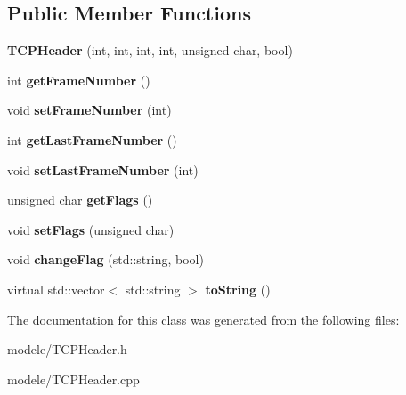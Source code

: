 \subsection*{Public Member Functions}
\begin{DoxyCompactItemize}
\item 
\hypertarget{class_t_c_p_header_adc62713dd706143c33ffd9f64bf953ba}{{\bfseries T\-C\-P\-Header} (int, int, int, int, unsigned char, bool)}\label{class_t_c_p_header_adc62713dd706143c33ffd9f64bf953ba}

\item 
\hypertarget{class_t_c_p_header_ae632ea82a7abfd4c8fab172637e86549}{int {\bfseries get\-Frame\-Number} ()}\label{class_t_c_p_header_ae632ea82a7abfd4c8fab172637e86549}

\item 
\hypertarget{class_t_c_p_header_a0042be1304d597b60363854bf9ca6bda}{void {\bfseries set\-Frame\-Number} (int)}\label{class_t_c_p_header_a0042be1304d597b60363854bf9ca6bda}

\item 
\hypertarget{class_t_c_p_header_a75eaeac4f1c200fd6635cbaa7359ce8d}{int {\bfseries get\-Last\-Frame\-Number} ()}\label{class_t_c_p_header_a75eaeac4f1c200fd6635cbaa7359ce8d}

\item 
\hypertarget{class_t_c_p_header_ac7e097249679015f91ab658c01e0ac37}{void {\bfseries set\-Last\-Frame\-Number} (int)}\label{class_t_c_p_header_ac7e097249679015f91ab658c01e0ac37}

\item 
\hypertarget{class_t_c_p_header_a9262d04f16f6a191b5184f2ebe9ec3e1}{unsigned char {\bfseries get\-Flags} ()}\label{class_t_c_p_header_a9262d04f16f6a191b5184f2ebe9ec3e1}

\item 
\hypertarget{class_t_c_p_header_a9687c1e1f936c7588f6a621c6396d1bf}{void {\bfseries set\-Flags} (unsigned char)}\label{class_t_c_p_header_a9687c1e1f936c7588f6a621c6396d1bf}

\item 
\hypertarget{class_t_c_p_header_a562f47954bf6762aaaf1300e5a6df5aa}{void {\bfseries change\-Flag} (std\-::string, bool)}\label{class_t_c_p_header_a562f47954bf6762aaaf1300e5a6df5aa}

\item 
\hypertarget{class_t_c_p_header_a54879f963c9911f3198688fdf392123a}{virtual std\-::vector$<$ std\-::string $>$ {\bfseries to\-String} ()}\label{class_t_c_p_header_a54879f963c9911f3198688fdf392123a}

\end{DoxyCompactItemize}


The documentation for this class was generated from the following files\-:\begin{DoxyCompactItemize}
\item 
modele/T\-C\-P\-Header.\-h\item 
modele/T\-C\-P\-Header.\-cpp\end{DoxyCompactItemize}
